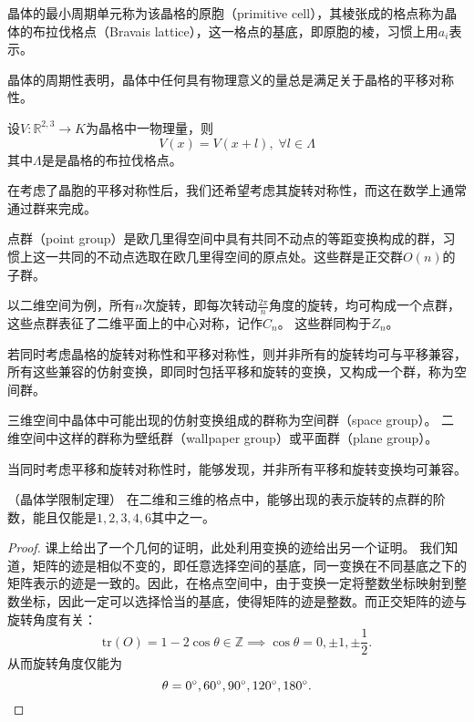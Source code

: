 \begin{definition}
    晶体的最小周期单元称为该晶格的原胞（primitive cell），其棱张成的格点称为晶体的布拉伐格点（Bravais lattice），这一格点的基底，即原胞的棱，习惯上用$a_i$表示。
\end{definition}

晶体的周期性表明，晶体中任何具有物理意义的量总是满足关于晶格的平移对称性。

\begin{proposition}
    设$V: \mathbb R^{2,3} \to K$为晶格中一物理量，则
    $$V(x) = V(x + l), \; \forall l \in \Lambda$$
    其中$\Lambda$是是晶格的布拉伐格点。
\end{proposition}

在考虑了晶胞的平移对称性后，我们还希望考虑其旋转对称性，而这在数学上通常通过群来完成。

\begin{definition}
    点群（point group）是欧几里得空间中具有共同不动点的等距变换构成的群，习惯上这一共同的不动点选取在欧几里得空间的原点处。这些群是正交群$O(n)$的子群。
\end{definition}

以二维空间为例，所有$n$次旋转，即每次转动$\frac{2\pi}{n}$角度的旋转，均可构成一个点群，这些点群表征了二维平面上的中心对称，记作$C_n$。
这些群同构于$Z_n$。

若同时考虑晶格的旋转对称性和平移对称性，则并非所有的旋转均可与平移兼容，所有这些兼容的仿射变换，即同时包括平移和旋转的变换，又构成一个群，称为空间群。

\begin{definition}
    三维空间中晶体中可能出现的仿射变换组成的群称为空间群（space group）。
    二维空间中这样的群称为壁纸群（wallpaper group）或平面群（plane group）。
\end{definition}

当同时考虑平移和旋转对称性时，能够发现，并非所有平移和旋转变换均可兼容。

\begin{theorem}
    （晶体学限制定理）
    在二维和三维的格点中，能够出现的表示旋转的点群的阶数，能且仅能是$1,2,3,4,6$其中之一。
\end{theorem}

\begin{proof}
    课上给出了一个几何的证明，此处利用变换的迹给出另一个证明。
    我们知道，矩阵的迹是相似不变的，即任意选择空间的基底，同一变换在不同基底之下的矩阵表示的迹是一致的。因此，在格点空间中，由于变换一定将整数坐标映射到整数坐标，因此一定可以选择恰当的基底，使得矩阵的迹是整数。而正交矩阵的迹与旋转角度有关：
    $$\mathrm{tr}(O) = 1 - 2 \cos \theta \in \mathbb Z \implies \cos \theta = 0, \pm 1, \pm \frac{1}{2}.$$
    从而旋转角度仅能为
    $$\theta = 0^\circ, 60^\circ, 90^\circ, 120^\circ, 180^\circ. \qedhere$$
\end{proof}

